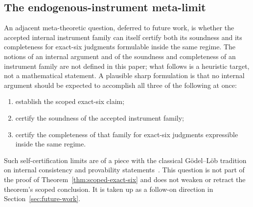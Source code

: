 \subsection{The endogenous-instrument meta-limit}\label{subsec:meta-limit}

An adjacent meta-theoretic question, deferred to future work, is
whether the accepted internal instrument family can itself certify
both its soundness and its completeness for exact-six judgments
formulable inside the same regime. The notions of an internal argument and of
the soundness and completeness of an instrument family are not defined in this
paper; what follows is a heuristic target, not a mathematical statement. A
plausible sharp formulation is
that no internal argument should be expected to accomplish all three
of the following at once:
\begin{enumerate}[topsep=2pt,itemsep=1pt]
  \item establish the scoped exact-six claim;
  \item certify the soundness of the accepted instrument family;
  \item certify the completeness of that family for exact-six
    judgments expressible inside the same regime.
\end{enumerate}
Such self-certification limits are of a piece with the classical
G{\"o}del--L{\"o}b tradition on internal consistency and provability
statements~\citep{Godel1931,Lob1955}. This question is not part of
the proof of Theorem~\ref{thm:scoped-exact-six} and does not weaken
or retract the theorem's scoped conclusion. It is taken up as a
follow-on direction in Section~\ref{sec:future-work}.
